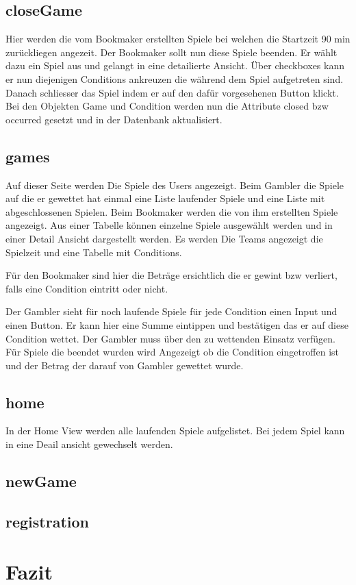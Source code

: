 \documentclass[a4paper, abstracton]{scrartcl}
\begin{document}
\subsection{closeGame}
  Hier werden die vom Bookmaker erstellten Spiele bei welchen die Startzeit
  90 min zurückliegen angezeit. Der Bookmaker sollt nun diese Spiele beenden.
  Er wählt dazu ein Spiel aus und gelangt in eine detailierte Ansicht.
  Über checkboxes kann er nun diejenigen Conditions ankreuzen die während dem
  Spiel aufgetreten sind. Danach schliesser das Spiel indem er auf den dafür
  vorgesehenen Button klickt.
  Bei den Objekten Game und Condition werden nun die Attribute closed bzw occurred
  gesetzt und in der Datenbank aktualisiert.

\subsection{games}
  Auf dieser Seite werden Die Spiele des Users angezeigt.
  Beim Gambler die Spiele auf die er gewettet hat einmal eine Liste laufender Spiele
  und eine Liste mit abgeschlossenen Spielen.
  Beim Bookmaker werden die von ihm erstellten Spiele angezeigt.
  Aus einer Tabelle können einzelne Spiele ausgewählt werden und in einer Detail
  Ansicht dargestellt werden. Es werden Die Teams angezeigt die Spielzeit und
  eine Tabelle mit Conditions.
  
  Für den Bookmaker sind hier die Beträge ersichtlich die er gewint bzw verliert,
  falls eine Condition eintritt oder nicht.
  
  Der Gambler sieht für noch laufende Spiele für jede Condition einen Input und
  einen Button. Er kann hier eine Summe eintippen und bestätigen das er auf diese
  Condition wettet. Der Gambler muss über den zu wettenden Einsatz verfügen.
  Für Spiele die beendet wurden wird Angezeigt ob die Condition eingetroffen ist
  und der Betrag der darauf von Gambler gewettet wurde.

\subsection{home}
  In der Home View werden alle laufenden Spiele aufgelistet.
  Bei jedem Spiel kann in eine Deail ansicht gewechselt werden.

\subsection{newGame}
  

\subsection{registration}

\section{Fazit}


\pagebreak
\listoffigures		%

\pagebreak	%


\pagebreak


\pagebreak	
\end{document}
